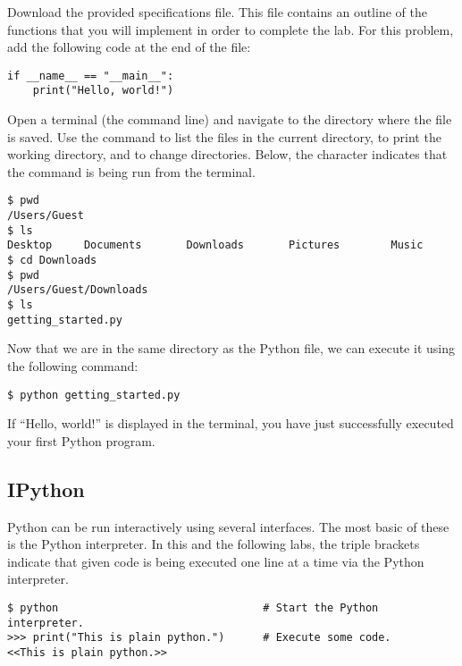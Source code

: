 \begin{problem}
Download the provided specifications file.
This file contains an outline of the functions that you will implement in order to complete the lab.
For this problem, add the following code at the end of the file:
\begin{lstlisting}
if __name__ == "__main__":
    print("Hello, world!")
\end{lstlisting}

Open a terminal (the command line) and navigate to the directory where the file is saved.
Use the  command to list the files in the current directory,  to print the working directory, and  to change directories.
Below, the \li{\$} character indicates that the command is being run from the terminal.

\begin{lstlisting}
$ pwd
/Users/Guest
$ ls
Desktop     Documents       Downloads       Pictures        Music
$ cd Downloads
$ pwd
/Users/Guest/Downloads
$ ls
getting_started.py
\end{lstlisting}

Now that we are in the same directory as the Python file, we can execute it using the following command:

\begin{lstlisting}
$ python getting_started.py
\end{lstlisting}

If ``Hello, world!'' is displayed in the terminal, you have just successfully executed your first Python program.
\end{problem}

\subsection*{IPython}

Python can be run interactively using several interfaces.
The most basic of these is the Python interpreter.
In this and the following labs, the triple brackets \li{>>>} indicate that given code is being executed one line at a time via the Python interpreter.

\begin{lstlisting}
$ python                                # Start the Python interpreter.
>>> print("This is plain python.")      # Execute some code.
<<This is plain python.>>
\end{lstlisting}

